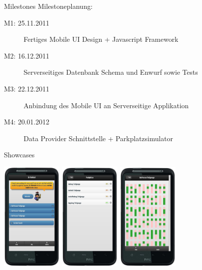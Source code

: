 \begin{frame}[t,fragile]{Milestones}
	Milestoneplanung:
	\begin{description}
		\item[M1: 25.11.2011] Fertiges Mobile UI Design + Javascript Framework
		\item[M2: 16.12.2011] Serverseitiges Datenbank Schema und Enwurf sowie Tests
		\item[M3: 22.12.2011] Anbindung des Mobile UI an Serverseitige Applikation
		\item[M4: 20.01.2012] Data Provider Schnittstelle + Parkplatzsimulator
	\end{description}
\end{frame}


\begin{frame}[t,fragile]{Showcases}
\begin{center}
	\includegraphics[width=3cm]{screen_1.jpg}
	\includegraphics[width=3cm]{screen_3.jpg}
	\includegraphics[width=3cm]{screen_2.jpg}
\end{center}

\end{frame}


